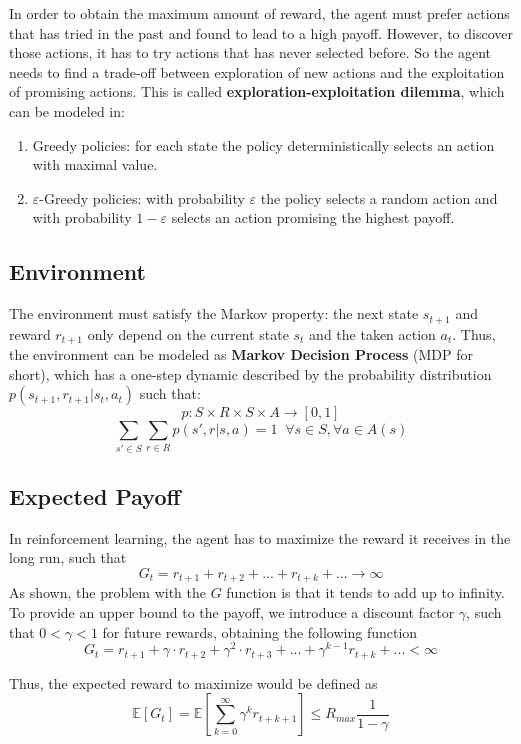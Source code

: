 \documentclass{article}
\begin{document}
\noindent
In order to obtain the maximum amount of reward, the agent must prefer actions that has tried in the past and found to lead to a high payoff. However, to discover those actions, it has to try actions that has never selected before. So the agent needs to find a trade-off between exploration of new actions and the exploitation of promising actions. This is called \textbf{exploration-exploitation dilemma}, which can be modeled in:
\begin{enumerate}
    \item Greedy policies: for each state the policy deterministically selects an action with maximal value.
    \item $\varepsilon$-Greedy policies: with probability $\varepsilon$ the policy selects a random action and with probability $1-\varepsilon$ selects an action promising the highest payoff.
\end{enumerate}

\subsection{Environment}
The environment must satisfy the Markov property: the next state $s_{t+1}$ and reward $r_{t+1}$ only depend on the current state $s_t$ and the taken action $a_t$. Thus, the environment can be modeled as \textbf{Markov Decision Process} (MDP for short), which has a one-step dynamic described by the probability distribution $p(s_{t+1}, r_{t+1}|s_t, a_t)$ such that:
$$p:S \times R \times S \times A \to [0, 1]$$
$$\sum_{s'\in S}\sum_{r\in R} p(s', r| s, a) = 1 \;\; \forall s \in S, \forall a \in A(s)$$

\subsection{Expected Payoff}
In reinforcement learning, the agent has to maximize the reward it receives in the long run, such that
$$G_t = r_{t+1} + r_{t+2} + ... + r_{t+k} + ... \to \infty$$
As shown, the problem with the $G$ function is that it tends to add up to infinity. To provide an upper bound to the payoff, we introduce a discount factor $\gamma$, such that $0 < \gamma < 1$ for future rewards, obtaining the following function
$$G_t = r_{t+1} + \gamma \cdot r_{t+2} + \gamma^2 \cdot r_{t+3} + ... + \gamma^{k-1} r_{t+k} + ... < \infty $$

Thus, the expected reward to maximize would be defined as
$$\mathbb{E}[G_t] = \mathbb{E}\left[\sum_{k=0}^{\infty}\gamma^k r_{t+k+1}\right] \le R_{max}\frac{1}{1-\gamma}$$
\end{document}
